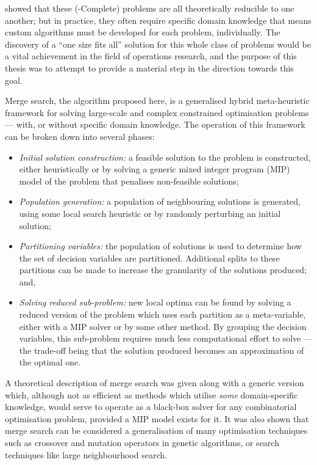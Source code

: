 \documentclass[journal]{IEEEtran}
\begin{document}
\cite{np:karp} showed that these (\NP-Complete) problems are all theoretically reducible to one another; but in practice, they often require specific domain knowledge that means custom algorithms must be developed for each problem, individually. The discovery of a ``one size fits all'' solution for this whole class of problems would be a vital achievement in the field of operations research, and the purpose of this thesis was to attempt to provide a material step in the direction towards this goal.

Merge search, the algorithm proposed here, is a generalised hybrid meta-heuristic framework for solving large-scale and complex constrained optimisation problems --- with, or without specific domain knowledge. The operation of this framework can be broken down into several phases:
\begin{itemize}
\item \emph{Initial solution construction:} a feasible solution to the problem is constructed, either heuristically or by solving a generic mixed integer program (MIP) model of the problem that penalises non-feasible solutions;
\item \emph{Population generation:} a population of neighbouring solutions is generated, using some local search heuristic or by randomly perturbing an initial solution;
\item \emph{Partitioning variables:} the population of solutions is used to determine how the set of decision variables are partitioned. Additional splits to these partitions can be made to increase the granularity of the solutions produced; and,
\item \emph{Solving reduced sub-problem:} new local optima can be found by solving a reduced version of the problem which uses each partition as a meta-variable, either with a MIP solver or by some other method. By grouping the decision variables, this sub-problem requires much less computational effort to solve --- the trade-off being that the solution produced becomes an approximation of the optimal one.
\end{itemize}

A theoretical description of merge search was given along with a generic version which, although not as efficient as methods which utilise \emph{some} domain-specific knowledge, would serve to operate as a black-box solver for any combinatorial optimisation problem, provided a MIP model exists for it. It was also shown that merge search can be considered a generalisation of many optimisation techniques such as crossover and mutation operators in genetic algorithms, or search techniques like large neighbourhood search.
\end{document}
